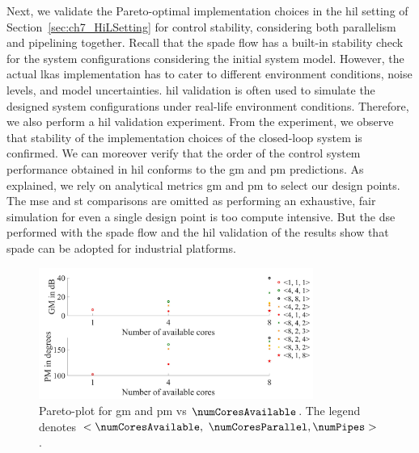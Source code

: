 Next, we validate the Pareto-optimal implementation choices in the \gls{hil} setting of Section~\ref{sec:ch7_HiLSetting} for control stability, considering both parallelism and pipelining together. 
Recall that the \gls{spade} flow has a built-in stability check for the system configurations considering the initial system model.
However, the actual \gls{lkas} implementation has to cater to different environment conditions, noise levels, and model uncertainties.
\Gls{hil} validation is often used to simulate the designed system configurations under real-life environment conditions. Therefore, we also perform a \gls{hil} validation experiment.
From the experiment, we observe that stability of the implementation choices of the closed-loop system is confirmed.
We can moreover verify that the order of the control system performance obtained in \gls{hil} conforms to the \gls{gm} and \gls{pm} predictions. 
As explained, we rely on analytical metrics \gls{gm} and \gls{pm} to select our design points.
The \gls{mse} and \gls{st} comparisons are omitted as performing an exhaustive, fair simulation for even a single design point is too compute intensive. But the \gls{dse} performed with the \gls{spade} flow and the \gls{hil} validation of the results show that \gls{spade} can be adopted for industrial platforms.

\begin{figure}[ht]
\centerline{
    \includegraphics[width=0.8\textwidth]{images/ParetoHiL.jpg}
    }
    \caption{Pareto-plot for \gls{gm} and \gls{pm} vs $\numCoresAvailable$. The legend denotes \mbox{$<\numCoresAvailable,\ \numCoresParallel, \numPipes>$}.}
    \label{fig:ch7_Pareto_HiL}
\end{figure}